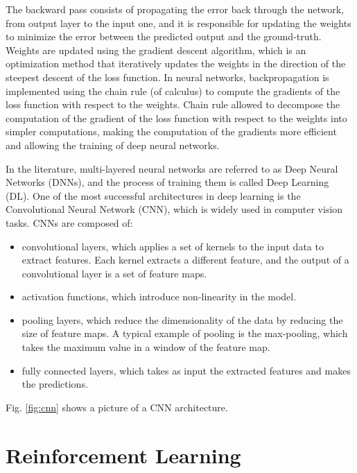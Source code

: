 The backward pass consists of propagating the error back through the network, from output layer to the input one, and it is responsible for updating the weights to minimize the error between the predicted output and the ground-truth.
Weights are updated using the gradient descent algorithm, which is an optimization method that iteratively updates the weights in the direction of the steepest descent of the loss function.
In neural networks, backpropagation is implemented using the chain rule (of calculus) to compute the gradients of the loss function with respect to the weights.
Chain rule allowed to decompose the computation of the gradient of the loss function with respect to the weights into simpler computations, making the computation of the gradients more efficient and allowing the training of deep neural networks.



In the literature, multi-layered neural networks are referred to as Deep Neural Networks (DNNs), and the process of training them is called Deep Learning (DL).
One of the most successful architectures in deep learning is the Convolutional Neural Network (CNN), which is widely used in computer vision tasks.
CNNs are composed of:
\begin{itemize}
    \item convolutional layers, which applies a set of kernels to the input data to extract features.
    Each kernel extracts a different feature, and the output of a convolutional layer is a set of feature maps.
    \item activation functions, which introduce non-linearity in the model.
    \item pooling layers, which reduce the dimensionality of the data by reducing the size of feature maps.
    A typical example of pooling is the max-pooling, which takes the maximum value in a window of the feature map.
    \item fully connected layers, which takes as input the extracted features and makes the predictions.
\end{itemize}

Fig. \ref{fig:cnn} shows a picture of a CNN architecture.


\section{Reinforcement Learning}
\label{sec:rl}

